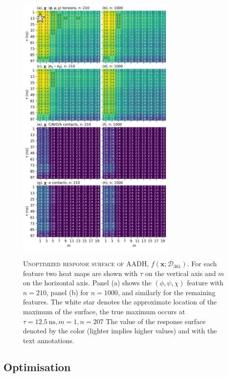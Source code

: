 \begin{figure}[p]
    \centering
    \caption[Unoptimized response surface of AADH]{\textsc{Unoptimized response surface of AADH, $f\left(\mathbf{x}; \mathcal{D}_{361}\right)$}. For each feature two heat maps are shown with $\tau$ on the vertical axis and $m$ on the horizontal axis. Panel (a) shows the  $(\phi, \psi, \chi)$ feature  with $n=210$,  panel (b) for $n=1000$,  and similarly for the remaining features. The white star denotes the approximate location of the maximum of the surface, the true maximum occurs at $\tau=\SI{12.5}{\nano\second}, m=1, n=207$  The value of the response surface denoted by the color (lighter implies higher values) and with the text annotations.}
    \includegraphics[width=0.7\textwidth]{chapters/msm_optimization/figures/aadh_response_surface_d.png}
    \label{fig:aadh_rsm}
\end{figure}

\subsection{Optimisation}\label{sec:aadh_bayes_opt}

